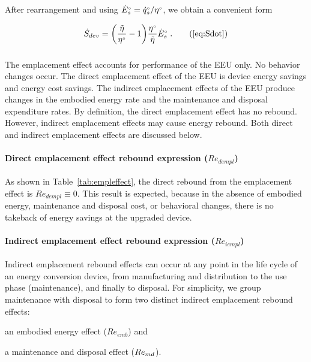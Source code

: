 After rearrangement and using ${}{\dot{E}}^{\scriptscriptstyle \circ}_s = {}{\dot{q}}^{\scriptscriptstyle \circ}_s/{}{\eta}^{\scriptscriptstyle \circ}$, 
we obtain a convenient form

\begin{equation}
  \Sdot = \Sdoteqn \; .  \tag{\ref{eq:Sdot}}
\end{equation}


\subsubsection{\Empleffect{}}
\label{sec:Re_emp}

The emplacement effect accounts for performance of the EEU only.
No behavior changes occur.
The direct emplacement effect of the EEU is device energy savings and energy cost savings.
The indirect emplacement effects of the EEU produce changes in the embodied energy rate and
the maintenance and disposal expenditure rates.
By definition, the direct emplacement effect has no rebound. 
However, indirect emplacement effects may cause energy rebound.
Both direct and indirect emplacement effects are discussed below.


\paragraph{Direct emplacement effect rebound expression ($Re_{dempl}$)}
\label{sec:Re_dempl}

As shown in Table~\ref{tab:empleffect},
the direct rebound from the emplacement effect is
$Re_{dempl} \equiv 0$.
This result is expected, 
because in the absence of
embodied energy, maintenance and disposal cost, or behavioral changes,
there is no takeback of energy savings
at the upgraded device.


\paragraph{Indirect emplacement effect rebound expression ($Re_{iempl}$)} 
\label{sec:Re_iempl}

Indirect emplacement rebound effects 
can occur at any point in the life cycle of an energy conversion device,
from manufacturing and distribution 
to the use phase (maintenance),
and finally to disposal.
For simplicity, we group maintenance with disposal to form
two distinct indirect emplacement rebound effects:
%
\begin{enumerate*}[label={(\roman*)}]
	
  \item an embodied energy effect ($Re_{emb}$) and 
  
  \item a maintenance and disposal effect ($Re_{md}$).
    
\end{enumerate*}


